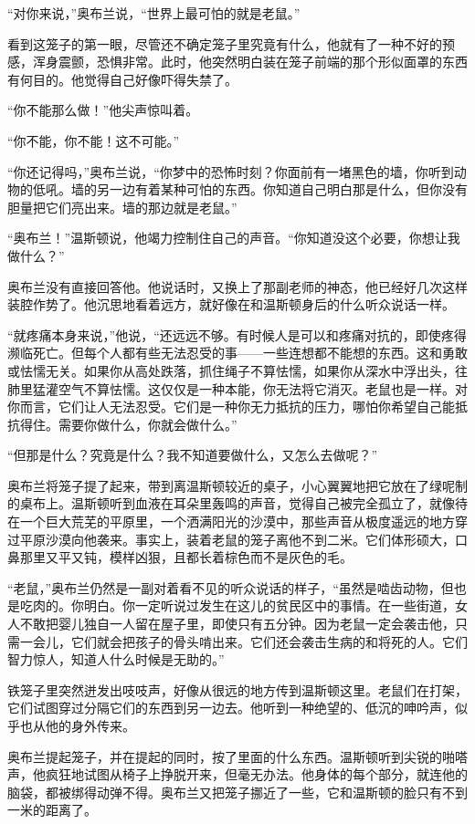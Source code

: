 ``对你来说，''奥布兰说，``世界上最可怕的就是老鼠。''

看到这笼子的第一眼，尽管还不确定笼子里究竟有什么，他就有了一种不好的预感，浑身震颤，恐惧非常。此时，他突然明白装在笼子前端的那个形似面罩的东西有何目的。他觉得自己好像吓得失禁了。

``你不能那么做！''他尖声惊叫着。

``你不能，你不能！这不可能。''

``你还记得吗，''奥布兰说，``你梦中的恐怖时刻？你面前有一堵黑色的墙，你听到动物的低吼。墙的另一边有着某种可怕的东西。你知道自己明白那是什么，但你没有胆量把它们亮出来。墙的那边就是老鼠。''

``奥布兰！''温斯顿说，他竭力控制住自己的声音。``你知道没这个必要，你想让我做什么？''

奥布兰没有直接回答他。他说话时，又换上了那副老师的神态，他已经好几次这样装腔作势了。他沉思地看着远方，就好像在和温斯顿身后的什么听众说话一样。

``就疼痛本身来说，''他说，``还远远不够。有时候人是可以和疼痛对抗的，即使疼得濒临死亡。但每个人都有些无法忍受的事------一些连想都不能想的东西。这和勇敢或怯懦无关。如果你从高处跌落，抓住绳子不算怯懦，如果你从深水中浮出头，往肺里猛灌空气不算怯懦。这仅仅是一种本能，你无法将它消灭。老鼠也是一样。对你而言，它们让人无法忍受。它们是一种你无力抵抗的压力，哪怕你希望自己能抵抗得住。需要你做什么，你就会做什么。''

``但那是什么？究竟是什么？我不知道要做什么，又怎么去做呢？''

奥布兰将笼子提了起来，带到离温斯顿较近的桌子，小心翼翼地把它放在了绿呢制的桌布上。温斯顿听到血液在耳朵里轰鸣的声音，觉得自己被完全孤立了，就像待在一个巨大荒芜的平原里，一个洒满阳光的沙漠中，那些声音从极度遥远的地方穿过平原沙漠向他袭来。事实上，装着老鼠的笼子离他不到二米。它们体形硕大，口鼻那里又平又钝，模样凶狠，且都长着棕色而不是灰色的毛。

``老鼠，''奥布兰仍然是一副对着看不见的听众说话的样子，``虽然是啮齿动物，但也是吃肉的。你明白。你一定听说过发生在这儿的贫民区中的事情。在一些街道，女人不敢把婴儿独自一人留在屋子里，即使只有五分钟。因为老鼠一定会袭击他，只需一会儿，它们就会把孩子的骨头啃出来。它们还会袭击生病的和将死的人。它们智力惊人，知道人什么时候是无助的。''

铁笼子里突然迸发出吱吱声，好像从很远的地方传到温斯顿这里。老鼠们在打架，它们试图穿过分隔它们的东西到另一边去。他听到一种绝望的、低沉的呻吟声，似乎也从他的身外传来。

奥布兰提起笼子，并在提起的同时，按了里面的什么东西。温斯顿听到尖锐的啪嗒声，他疯狂地试图从椅子上挣脱开来，但毫无办法。他身体的每个部分，就连他的脑袋，都被绑得动弹不得。奥布兰又把笼子挪近了一些，它和温斯顿的脸只有不到一米的距离了。

